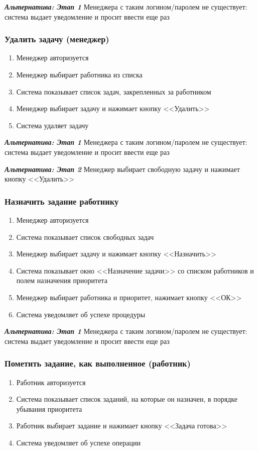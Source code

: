 		\textbf{\textit{Альтернатива: Этап 1}} Менеджера с таким логином/паролем не существует: система выдает уведомление и просит ввести еще раз
		
	
	\subsubsection{Удалить задачу (менеджер)}
		\begin{enumerate}
		\item	Менеджер авторизуется
		\item	Менеджер выбирает работника из списка
		\item	Система показывает список задач, закрепленных за работником
		\item	Менеджер выбирает задачу и нажимает кнопку <<Удалить>>
		\item	Система удаляет задачу
		\end{enumerate}
		
		\textbf{\textit{Альтернатива: Этап 1}} Менеджера с таким логином/паролем не существует: система выдает уведомление и просит ввести еще раз
		
		\textbf{\textit{Альтернатива: Этап 2}} Менеджер выбирает свободную задачу и нажимает кнопку <<Удалить>>
		
	\subsubsection{Назначить задание работнику}
		\begin{enumerate}
		\item	Менеджер авторизуется
		\item	Система показывает список свободных задач
		\item	Менеджер выбирает задачу и нажимает кнопку <<Назначить>>
		\item	Система показывает окно <<Назначение задачи>> со списком работников и полем назначения приоритета
		\item	Менеджер выбирает работника и приоритет, нажимает кнопку <<ОК>>
		\item	Система уведомляет об успехе процедуры 			
		\end{enumerate}
		
		\textbf{\textit{Альтернатива: Этап 1}} Менеджера с таким логином/паролем не существует: система выдает уведомление и просит ввести еще раз
		
	\subsubsection{Пометить задание, как выполненное (работник)}
		\begin{enumerate}
		\item	Работник авторизуется
		\item	Система показывает список заданий, на которые он назначен, в порядке убывания приоритета
		\item	Работник выбирает задание и нажимает кнопку <<Задача готова>>
		\item	Система уведомляет об успехе операции				
		\end{enumerate}
	
